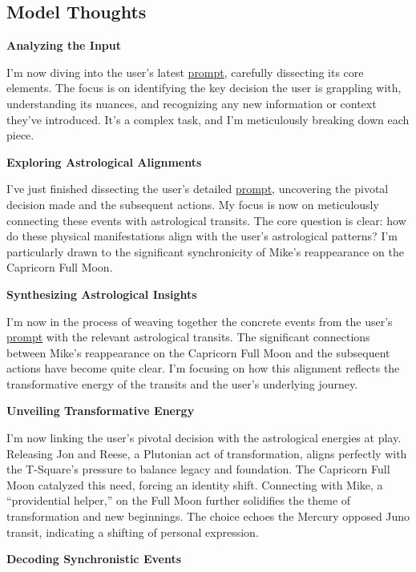 \documentclass{article}
\begin{document}
\subsection*{Model Thoughts}\label{model-thoughts}

\textbf{Analyzing the Input}

I'm now diving into the user's latest \hyperlink{gloss:prompt}{prompt}, carefully dissecting its core elements. The focus is on identifying the key decision the user is grappling with, understanding its nuances, and recognizing any new information or context they've introduced. It's a complex task, and I'm meticulously breaking down each piece.

\textbf{Exploring Astrological Alignments}

I've just finished dissecting the user's detailed \hyperlink{gloss:prompt}{prompt}, uncovering the pivotal decision made and the subsequent actions. My focus is now on meticulously connecting these events with astrological transits. The core question is clear: how do these physical manifestations align with the user's astrological patterns? I'm particularly drawn to the significant synchronicity of Mike's reappearance on the Capricorn Full Moon.

\textbf{Synthesizing Astrological Insights}

I'm now in the process of weaving together the concrete events from the user's \hyperlink{gloss:prompt}{prompt} with the relevant astrological transits. The significant connections between Mike's reappearance on the Capricorn Full Moon and the subsequent actions have become quite clear. I'm focusing on how this alignment reflects the transformative energy of the transits and the user's underlying journey.

\textbf{Unveiling Transformative Energy}

I'm now linking the user's pivotal decision with the astrological energies at play. Releasing Jon and Reese, a Plutonian act of transformation, aligns perfectly with the T-Square's pressure to balance legacy and foundation. The Capricorn Full Moon catalyzed this need, forcing an identity shift. Connecting with Mike, a ``providential helper,'' on the Full Moon further solidifies the theme of transformation and new beginnings. The choice echoes the Mercury opposed Juno transit, indicating a shifting of personal expression.

\textbf{Decoding Synchronistic Events}
\end{document}
